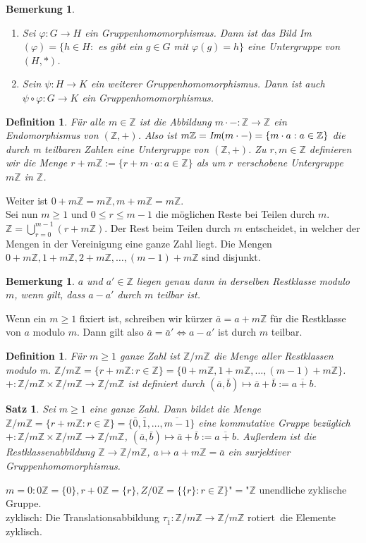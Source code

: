 \documentclass[12pt,a4paper]{article}
\theoremstyle{plain}
\newtheorem{Satz}[Theorem]{Satz}
\newtheorem{Definition}[Theorem]{Definition}
\newtheorem{Bemerkung}[Theorem]{Bemerkung}
\newcommand{\Z}{\mathbb{Z}}
\numberwithin{equation}{section}
\begin{document}
\begin{Bemerkung}\ 
\begin{enumerate}
\renewcommand{\labelenumi}{(\roman{enumi})}
\item Sei $\varphi:G\rightarrow H$ ein Gruppenhomomorphismus. Dann ist das Bild Im$(\varphi)=\{h\in H:$ es gibt ein $g\in G$ mit $\varphi(g)=h\}$ eine Untergruppe von $(H,*)$.
\item Sein $\psi: H\rightarrow K$ ein weiterer Gruppenhomomorphismus. Dann ist auch $\psi\circ\varphi:G\rightarrow K$ ein Gruppenhomomorphismus.
\end{enumerate}
\end{Bemerkung}
\begin{Definition}
Für alle $m\in\Z$ ist die Abbildung $m\cdot - :\Z\rightarrow\Z$ ein Endomorphismus von $(\Z,+)$. Also ist $m\Z=\emph{Im}(m\cdot -)=\{m\cdot a: a\in \Z\}$ die durch m teilbaren Zahlen eine Untergruppe von $(\Z,+)$.
Zu $r,m \in \Z$ definieren wir die Menge $r + m\Z:=\{r+m\cdot a: a\in \Z\}$ als um $r$ verschobene Untergruppe $m\Z$ in $\Z$.
\end{Definition}
Weiter ist $0+m\Z=m\Z, m+m\Z=m\Z$.\\
Sei nun $m\geq 1$ und $0\leq r\leq m-1$ \glqq die möglichen Reste bei Teilen durch $m$\grqq. $\Z=\bigcup_{r=0}^{m-1}{(r+m\Z)}$. Der Rest beim Teilen durch $m$ entscheidet, in welcher der Mengen in der Vereinigung eine ganze Zahl liegt. Die Mengen $0+m\Z,1+m\Z,2+m\Z,\ldots,(m-1)+m\Z$ sind disjunkt.
\begin{Bemerkung}
$a$ und $a'\in \Z$ liegen genau dann in derselben Restklasse modulo $m$, wenn gilt, dass $a-a'$ durch $m$ teilbar ist.
\end{Bemerkung}
Wenn ein $m\geq 1$ fixiert ist, schreiben wir kürzer $\bar{a}=a+m\Z$ für die Restklasse von $a$ modulo $m$. Dann gilt also $\bar{a}=\bar{a}' \Leftrightarrow a-a'$ ist durch $m$ teilbar.
\begin{Definition}
Für $m\geq 1$ ganze Zahl ist $\Z/m\Z$ die Menge aller Restklassen modulo m. $\Z/m\Z=\{r+m\Z:r\in\Z\}=\{0+m\Z,1+m\Z,\ldots,(m-1)+m\Z\}$. $+:\Z/m\Z\times\Z/m\Z\rightarrow\Z/m\Z$ ist definiert durch $(\bar{a},\bar{b})\mapsto \bar{a}+\bar{b}:=\overline{a+b}$. 
\end{Definition}
\begin{Satz}
Sei $m\geq 1$ eine ganze Zahl. Dann bildet die Menge $\Z/m\Z=\{r+m\Z: r\in \Z\}=\{\bar{0},\bar{1},\ldots,\overline{m-1}\}$ eine kommutative Gruppe bezüglich $+:\Z/m\Z\times\Z/m\Z\rightarrow\Z/m\Z$, $(\bar{a},\bar{b})\mapsto \bar{a}+\bar{b}:=\overline{a+b}$. Außerdem ist die Restklassenabbildung $\Z\rightarrow \Z/m\Z$, $ a\mapsto a+m\Z=\bar{a}$ ein surjektiver Gruppenhomomorphismus.
\end{Satz}
$m=0: 0\Z=\{0\}, r+0\Z=\{r\}, Z/0\Z=\{\{r\}:r\in\Z\}$"$=$"$\Z$ unendliche zyklische Gruppe.\\
zyklisch: Die Translationsabbildung $\tau_{\bar{1}}:\Z/m\Z\rightarrow\Z/m\Z$ \glqq rotiert\grqq\ die Elemente zyklisch.
\end{document}
